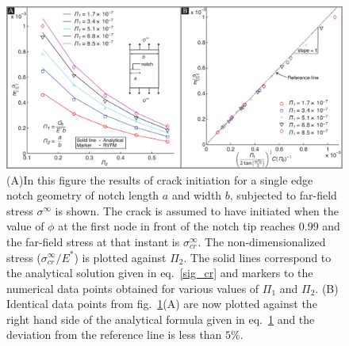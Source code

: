 \documentclass[12pt,letterpaper]{article}
\let\Pi\varPi
\begin{document}
\begin{figure}[b!]
	\center
	\includegraphics[width=1.0\textwidth]{./Figures/combined_plot.pdf}
	\vspace{-8pt}
	\caption{
		{\footnotesize (A)In this figure the results of crack initiation for a single edge notch geometry of notch length $a$ and width $b$, subjected to far-field stress $\sigma^\infty$ is shown. The crack is assumed to have initiated when the value of $\phi$ at the first node in front of the notch tip reaches $0.99$ and the far-field stress at that instant is $\sigma_{cr}^{\infty}$. The non-dimensionalized stress ($\sigma_{cr}^{\infty}/E^*$) is plotted against $\Pi_\mathit{2}$. The solid lines correspond to the analytical solution given in eq.~\ref{sig_cr} and markers to the numerical data points obtained for various values of $\Pi_\mathit{1}$ and $\Pi_\mathit{2}$. (B) Identical data points from fig.~\ref{fig1}(A) are now plotted against the right hand side of the analytical formula given in eq.~\ref{fig1} and the deviation from the reference line is less than $5\%$. 
		}
		\label{fig1}
	}
	
	\vspace{-10pt}
\end{figure}
\end{document}
